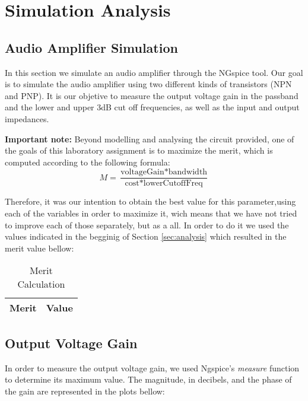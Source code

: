 \section{Simulation Analysis}
\label{sec:simulation}

\subsection{Audio Amplifier Simulation}
\label{subsec:amp_simulation}
\par In this section we simulate an audio amplifier through the NGspice tool. Our goal is to simulate the audio amplifier using two different kinds of transistors (NPN and PNP). It is our objetive to measure the output voltage gain in the passband and the lower and upper 3dB cut off frequencies, as well as the input and output impedances.

\par  \textbf{Important note:} Beyond modelling and analysing the circuit provided, one of the goals of this laboratory assignment is to maximize the merit, which is computed according to the following formula:
\begin{equation}
M = \frac{\text{voltageGain}*\text{bandwidth}}{\text{cost}*\text{lowerCutoffFreq}}
\end{equation}

Therefore, it was our intention to obtain the best value for this parameter,using each of the variables in order to maximize it, wich means that we have not tried to improve each of those separately, but as a all.
In order to do it we used the values indicated in the begginig of Section \ref{sec:analysis} which resulted in the merit value bellow:

\begin{table}[H]
  \centering
  \begin{tabular}{ | m{11cm} | m{3cm}| } 
    \hline    
    {\bf Merit} & {\bf Value} \\ \hline
    
  \end{tabular}
  \caption{Merit Calculation}
  \label{tab:merit}
\end{table}

\subsection{Output Voltage Gain}
\label{output_gain}
\par In order to measure the output voltage gain, we used Ngspice's \textit{measure} function to determine its maximum value.
 The magnitude, in decibels, and the phase of the gain are represented in the plots bellow:

